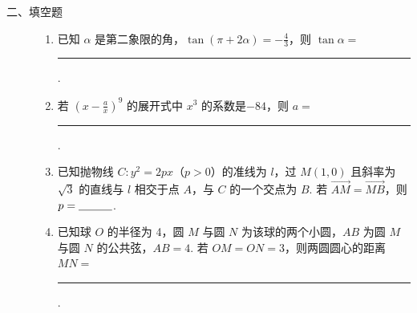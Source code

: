 \begin{description}

    \item[二、填空题]

    \begin{enumerate}[leftmargin=5pt]

      \addtocounter{enumi}{+12}

        \item 已知 \(\alpha\) 是第二象限的角，\(\tan\left(\pi + 2\alpha\right) = -\frac{4}{3}\)，则 \(\tan\alpha =\)\rule[-0.3ex]{3em}{0.4pt}.

        \item 若 \(\left(x - \frac{a}{x}\right)^9\) 的展开式中 \(x^3\) 的系数是\(-84\)，则 \(a =\)\rule[-0.3ex]{3em}{0.4pt}.

        \item 已知抛物线 \(C: y^2 = 2px\)（\(p > 0\)）的准线为 \(l\)，过 \(M(1,0)\) 且斜率为 \(\sqrt{3}\) 的直线与 \(l\) 相交于点 \(A\)，与 \(C\) 的一个交点为 \(B\). 若 \(\overrightarrow{AM} = \overrightarrow{MB}\)，则 \(p =\rule[-0.3ex]{3em}{0.4pt}\).

        \item 已知球 \(O\) 的半径为 4，圆 \(M\) 与圆 \(N\) 为该球的两个小圆，\(AB\) 为圆 \(M\) 与圆 \(N\) 的公共弦，\(AB = 4\). 若 \(OM = ON = 3\)，则两圆圆心的距离 \(MN = \)\rule[-0.3ex]{3em}{0.4pt}.

    \end{enumerate}

\end{description}

